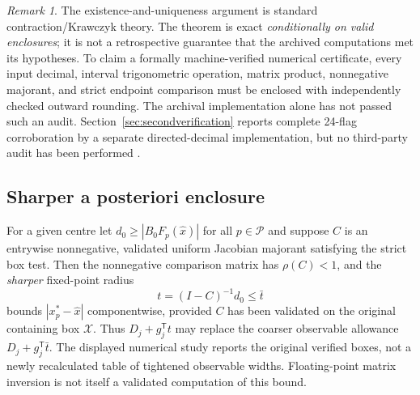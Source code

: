 \documentclass[11pt,a4paper]{article}
\theoremstyle{remark}\newtheorem{remark}[theorem]{Remark}
\newcommand{\boxx}{\mathcal X}\newcommand{\pp}{\mathcal P}
\begin{document}
\begin{remark}
The existence-and-uniqueness argument is standard contraction/Krawczyk theory. The theorem is exact \emph{conditionally on valid enclosures}; it is not a retrospective guarantee that the archived computations met its hypotheses. To claim a formally machine-verified numerical certificate, every input decimal, interval trigonometric operation, matrix product, nonnegative majorant, and strict endpoint comparison must be enclosed with independently checked outward rounding. The archival implementation alone has not passed such an audit. Section~\ref{sec:secondverification} reports complete 24-flag corroboration by a separate directed-decimal implementation, but no third-party audit has been performed \citep{krawczyk1969,moore1966,neumaier1990,rump2010}.
\end{remark}

\subsection{Sharper a posteriori enclosure}
For a given centre let $d_0\ge|B_0F_p(\widehat x)|$ for all $p\in\mathcal P$ and suppose $C$ is an entrywise nonnegative, validated uniform Jacobian majorant satisfying the strict box test. Then the nonnegative comparison matrix has $\rho(C)<1$, and the \emph{sharper} fixed-point radius
\begin{equation}\label{eq:H}
 t=(I-C)^{-1}d_0\le\bar t
\end{equation}
bounds $|x_p^*-\widehat x|$ componentwise, provided $C$ has been validated on the original containing box $\boxx$. Thus $D_j+g_j^\mathsf T t$ may replace the coarser observable allowance $D_j+g_j^\mathsf T\bar t$. The displayed numerical study reports the original verified boxes, not a newly recalculated table of tightened observable widths. Floating-point matrix inversion is not itself a validated computation of this bound.
\end{document}
